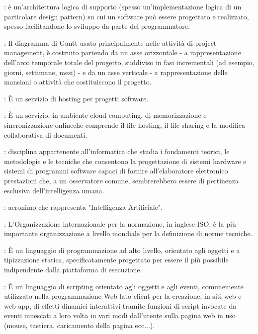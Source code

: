{		  : è un'architettura logica di supporto (spesso un'implementazione logica di un particolare design pattern) su cui un software può essere progettato e realizzato, spesso facilitandone lo sviluppo da parte del programmatore.
		
		: Il diagramma di Gantt usato principalmente nelle attività di project management, è costruito partendo da un asse orizzontale - a rappresentazione dell'arco temporale totale del progetto, suddiviso in fasi incrementali (ad esempio, giorni, settimane, mesi) - e da un asse verticale - a rappresentazione delle mansioni o attività che costituiscono il progetto.
		
		: È un servizio di hosting per progetti software.

		: È un servizio, in ambiente cloud computing, di memorizzazione e sincronizzazione onlineche comprende il file hosting, il file sharing e la modifica collaborativa di documenti.


		: disciplina appartenente all'informatica che studia i fondamenti teorici, le metodologie e le tecniche che consentono la progettazione di sistemi hardware e sistemi di programmi software capaci di fornire all’elaboratore elettronico prestazioni che, a un osservatore comune, sembrerebbero essere di pertinenza esclusiva dell’intelligenza umana.
		
		: acronimo che rappresenta "Intelligenza Artificiale".

		: L'Organizzazione internazionale per la normazione, in inglese ISO, è la più importante organizzazione a livello mondiale per la definizione di norme tecniche.		
	
		: È un linguaggio di programmazione ad alto livello, orientato agli oggetti e a tipizzazione statica, specificatamente progettato per essere il più possibile indipendente dalla piattaforma di esecuzione.
	
		: È un linguaggio di scripting orientato agli oggetti e agli eventi, comunemente utilizzato nella programmazione Web lato client per la creazione, in siti web e web-app, di effetti dinamici interattivi tramite funzioni di script invocate da eventi innescati a loro volta in vari modi dall'utente sulla pagina web in uso (mouse, tastiera, caricamento della pagina ecc...).
	
}
